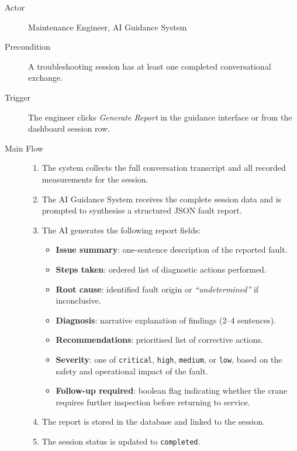 \begin{description}
    \item[Actor] Maintenance Engineer, AI Guidance System
    \item[Precondition]
        A troubleshooting session has at least one completed conversational exchange.
    \item[Trigger]
        The engineer clicks \textit{Generate Report} in the guidance interface or
        from the dashboard session row.
    \item[Main Flow]
        \begin{enumerate}[noitemsep]
            \item The system collects the full conversation transcript and all
                  recorded measurements for the session.
            \item The AI Guidance System receives the complete session data and is
                  prompted to synthesise a structured JSON fault report.
            \item The AI generates the following report fields:
                \begin{itemize}[noitemsep]
                    \item \textbf{Issue summary}: one-sentence description of the reported fault.
                    \item \textbf{Steps taken}: ordered list of diagnostic actions performed.
                    \item \textbf{Root cause}: identified fault origin or
                          \textit{``undetermined''} if inconclusive.
                    \item \textbf{Diagnosis}: narrative explanation of findings (2--4 sentences).
                    \item \textbf{Recommendations}: prioritised list of corrective actions.
                    \item \textbf{Severity}: one of \texttt{critical}, \texttt{high},
                          \texttt{medium}, or \texttt{low}, based on the safety and
                          operational impact of the fault.
                    \item \textbf{Follow-up required}: boolean flag indicating whether
                          the crane requires further inspection before returning to service.
                \end{itemize}
            \item The report is stored in the database and linked to the session.
            \item The session status is updated to \texttt{completed}.

\end{enumerate}
\end{description}

